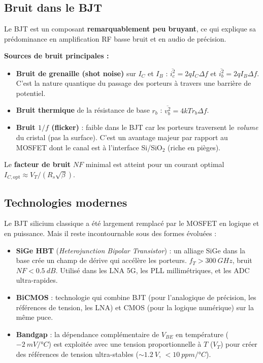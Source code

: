 \documentclass[12pt,a4paper,twoside]{book}
\begin{document}
\subsection{Bruit dans le BJT}

Le BJT est un composant \textbf{remarquablement peu bruyant}, ce qui explique sa prédominance en amplification RF basse bruit et en audio de précision.

\begin{formule}
\textbf{Sources de bruit principales :}
\begin{itemize}[nosep]
\item \textbf{Bruit de grenaille (shot noise)} sur $I_C$ et $I_B$ : $\overline{i_c^2} = 2qI_C\Delta f$ et $\overline{i_b^2} = 2qI_B\Delta f$. C'est la nature quantique du passage des porteurs à travers une barrière de potentiel.
\item \textbf{Bruit thermique} de la résistance de base $r_b$ : $\overline{v_b^2} = 4kTr_b\Delta f$.
\item \textbf{Bruit $1/f$ (flicker)} : faible dans le BJT car les porteurs traversent le \textit{volume} du cristal (pas la surface). C'est un avantage majeur par rapport au MOSFET dont le canal est à l'interface Si/SiO$_2$ (riche en pièges).
\end{itemize}

Le \textbf{facteur de bruit} $NF$ minimal est atteint pour un courant optimal $I_{C,\text{opt}} \approx V_T/(R_s \sqrt{\beta})$.
\end{formule}

\subsection{Technologies modernes}

\begin{pratique}
Le BJT silicium classique a été largement remplacé par le MOSFET en logique et en puissance. Mais il reste incontournable sous des formes évoluées :

\begin{itemize}[nosep]
\item \textbf{SiGe HBT} (\textit{Heterojunction Bipolar Transistor}) : un alliage SiGe dans la base crée un champ de dérive qui accélère les porteurs. $f_T > \SI{300}{GHz}$, bruit $NF < \SI{0.5}{dB}$. Utilisé dans les LNA 5G, les PLL millimétriques, et les ADC ultra-rapides.
\item \textbf{BiCMOS} : technologie qui combine BJT (pour l'analogique de précision, les références de tension, les LNA) et CMOS (pour la logique numérique) sur la même puce.
\item \textbf{Bandgap} : la dépendance complémentaire de $V_{BE}$ en température ($\SI{-2}{mV/°C}$) est exploitée avec une tension proportionnelle à $T$ ($V_T$) pour créer des références de tension ultra-stables ($\sim\SI{1.2}{V}$, $< \SI{10}{ppm/°C}$).
\end{itemize}
\end{pratique}
\end{document}
